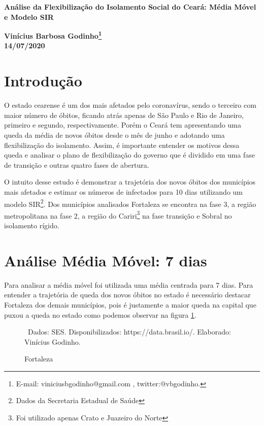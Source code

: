 \documentclass[a4paper,12pt,oneside,titlepage]{article}
\begin{document}
\begin{center}
	

\textbf{Análise da Flexibilização do Isolamento Social do Ceará: Média Móvel e  Modelo SIR}


\end{center}
\begin{flushright}
	\textbf{Vinícius Barbosa Godinho\footnote{E-mail: viniciusbgodinho@gmail.com ,   twitter:@vbgodinho.}} \\
	\textbf{14/07/2020}
\end{flushright}


\section{Introdução}	


O estado cearense é um dos mais afetados pelo coronavírus, sendo o terceiro com maior número de óbitos, ficando atrás apenas de São Paulo e Rio de Janeiro, primeiro e segundo, respectivamente. Porém o Ceará tem apresentando uma queda da média de novos óbitos desde o mês de junho e adotando uma flexibilização do isolamento. Assim, é importante entender os motivos dessa queda e analisar o plano de flexibilização do governo que é dividido em uma fase de transição e outras quatro fases de abertura.

O intuito desse estudo é demonstrar a trajetória dos novos óbitos dos municípios mais afetados e estimar os números de infectados para 10 dias utilizando um modelo SIR\footnote{Dados da Secretaria Estadual de Saúde}. Dos municípios analisados Fortaleza se encontra na fase 3, a região metropolitana na fase 2, a região do Cariri\footnote{Foi utilizado apenas Crato e Juazeiro do Norte} na fase transição e Sobral no isolamento rígido. 

  

\section{Análise Média Móvel: 7 dias}

Para analisar a média móvel foi utilizada uma média centrada para 7 dias. Para entender a trajetória de queda dos novos óbitos no estado é necessário destacar Fortaleza dos demais municípios, pois é justamente a maior queda na capital que puxou a queda no estado como podemos observar na figura \ref{g1}. 
	
	\begin{figure}[H]
		\centering
		\caption{Fortaleza}
		
		\label{g1}
		\ \footnotesize Dados: SES. Disponibilizados: https://data.brasil.io/. Elaborado: Vinícius Godinho. 
		
	\end{figure}
	
\end{document}
